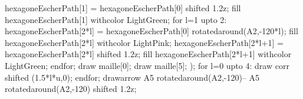 \begin{corrige}
\begin{enumerate}
{\begin{Geometrie}[CoinHD={(9u,4u)}]
            hexagoneEscherPath[1] = hexagoneEscherPath[0] shifted 1.2z;
            fill hexagoneEscherPath[1] withcolor LightGreen;
            for l=1 upto 2:
                    hexagoneEscherPath[2*l] = hexagoneEscherPath[0] rotatedaround(A2,-120*l);
                fill hexagoneEscherPath[2*l] withcolor LightPink;
                hexagoneEscherPath[2*l+1] = hexagoneEscherPath[2*l] shifted 1.2z;
                fill hexagoneEscherPath[2*l+1] withcolor LightGreen;
            endfor;
            draw maille[0];
            draw maille[5];
            );
            for l=0 upto 4:
                draw corr shifted (1.5*l*u,0);
            endfor;  
            drawarrow A5 rotatedaround(A2,-120)-- A5 rotatedaround(A2,-120) shifted 1.2z;
        \end{Geometrie}
        }
    \end{enumerate}
\end{corrige}

